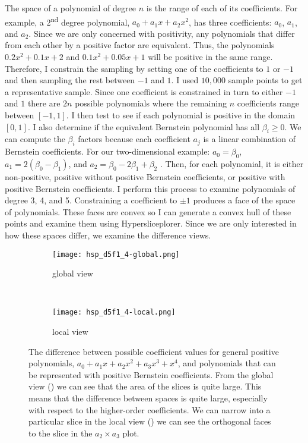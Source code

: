 The space of a polynomial of degree \(n\) is the range of each of its
coefficients. For example, a 2\textsuperscript{nd} degree polynomial, \(a_0
+ a_1 x + a_2 x^2\), has three coefficients: \(a_0\), \(a_1\), and \(a_2\).
Since we are only concerned with positivity, any polynomials that differ from
each other by a positive factor are equivalent. Thus, the polynomials
$0.2x^2 + 0.1x + 2$ and $0.1x^2 + 0.05x + 1$ will be positive in the same
range. Therefore, I constrain the sampling by setting one of the
coefficients to $1$ or $-1$ and then sampling the rest between $-1$ and $1$.
I used $10,000$ sample points to get a representative sample.
Since one coefficient is constrained in turn to
either \(-1\) and \(1\) there are \(2n\) possible polynomials where the remaining
\(n\) coefficients range between \([-1,1]\). I then test to see if each
polynomial is positive in the domain \([0,1]\). I also determine if the
equivalent Bernstein polynomial has all \(\beta_i \ge 0\). We can compute the
\(\beta_i\) factors because each coefficient \(a_j\) is a linear combination of
Bernstein coefficients. For our two-dimensional example: \(a_0 = \beta_0\),
\(a_1 = 2(\beta_0-\beta_1)\), and \(a_2=\beta_0 - 2\beta_1 + \beta_2\) . Then,
for each polynomial, it is either non-positive, positive without positive Bernstein coefficients, or positive with 
positive Bernstein coefficients. I perform this process to examine polynomials of
degree 3, 4, and 5. Constraining a coefficient to $\pm 1$ produces a
face of the space of polynomials. These faces are convex so I can generate a
convex hull of these points and examine them using Hypersliceplorer. Since we
are only interested in how these spaces differ, we examine the difference views.

\begin{figure}
  \centering
  \begin{subfigure}[b]{0.45\linewidth}
    \texttt{[image: hsp\_d5f1\_4-global.png]}
    \caption{global view}
    \label{fig:spacediff:global}
  \end{subfigure}
  ~
  \begin{subfigure}[b]{0.45\linewidth}
    \texttt{[image: hsp\_d5f1\_4-local.png]}
    \caption{local view}
    \label{fig:spacediff:local}
  \end{subfigure}
  \caption{
    The difference between possible coefficient values for general positive 
    polynomials, $a_0 + a_1 x + a_2 x^2 + a_3 x^3 + x^4$, and polynomials
    that can be represented with positive Bernstein coefficients. From the 
    global view () we can see that the 
    area of the slices is quite large. This means that the 
    difference between spaces is quite large, especially with respect to the
    higher-order coefficients. We can narrow into a particular slice in
    the local view () we can see 
    the orthogonal faces to the slice in the $a_2 \times a_3$ plot.
  }
  \label{fig:spacediff}
\end{figure}


